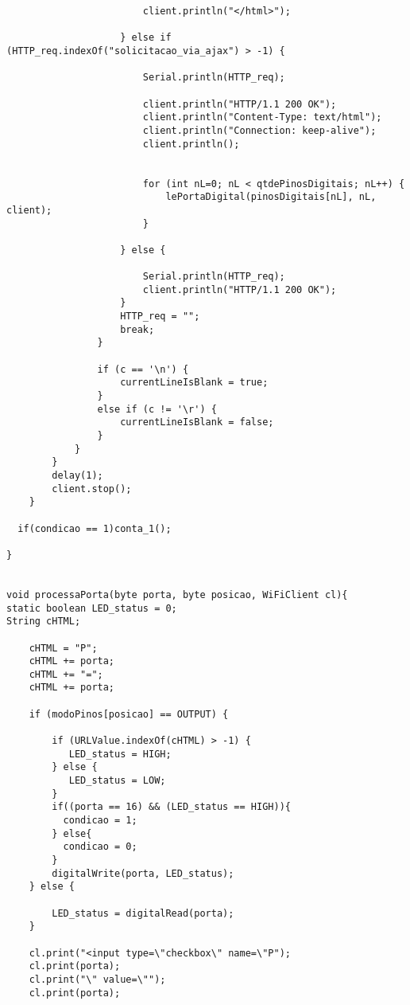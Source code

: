 \begin{lstlisting}
                        client.println("</html>");
                    
                    } else if (HTTP_req.indexOf("solicitacao_via_ajax") > -1) {  

                        Serial.println(HTTP_req);

                        client.println("HTTP/1.1 200 OK");
                        client.println("Content-Type: text/html");
                        client.println("Connection: keep-alive");      
                        client.println();                      


                        for (int nL=0; nL < qtdePinosDigitais; nL++) {
                            lePortaDigital(pinosDigitais[nL], nL, client);
                        }
                            
                    } else {

                        Serial.println(HTTP_req);
                        client.println("HTTP/1.1 200 OK");
                    }
                    HTTP_req = "";    
                    break;
                }
                
                if (c == '\n') {
                    currentLineIsBlank = true;
                } 
                else if (c != '\r') {
                    currentLineIsBlank = false;
                }
            }
        } 
        delay(1);     
        client.stop(); 
    } 

  if(condicao == 1)conta_1();
  
}


void processaPorta(byte porta, byte posicao, WiFiClient cl){
static boolean LED_status = 0;
String cHTML;
   
    cHTML = "P";
    cHTML += porta;
    cHTML += "=";
    cHTML += porta;

    if (modoPinos[posicao] == OUTPUT) { 
        
        if (URLValue.indexOf(cHTML) > -1) { 
           LED_status = HIGH;
        } else {
           LED_status = LOW;
        }
        if((porta == 16) && (LED_status == HIGH)){
          condicao = 1;
        } else{
          condicao = 0;
        }
        digitalWrite(porta, LED_status);
    } else {

        LED_status = digitalRead(porta);
    }

    cl.print("<input type=\"checkbox\" name=\"P");
    cl.print(porta);
    cl.print("\" value=\"");
    cl.print(porta);
    

\end{lstlisting}
